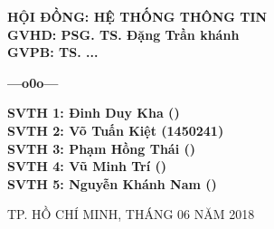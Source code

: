 \begin{titlepage}
\begin{center}
\begin{tabular}{@{}c}
	\end{tabular}
\end{center}
	
\hspace{4.5cm}	
\begin{minipage}[t]{0.7\linewidth}
\large
	\textbf{HỘI ĐỒNG: HỆ THỐNG THÔNG TIN}\\ [0.5cm]
	\textbf{GVHD: PSG. TS. Đặng Trần khánh}\\ [0.5cm]
	\textbf{GVPB: TS. ...}\\
	\vspace{-0.7cm}
	\begin{center}
	\textbf{---o0o---}
	\end{center}
	\textbf{SVTH 1: Đinh Duy Kha ()}\\ [0.5cm]
	\textbf{SVTH 2: Võ Tuấn Kiệt (1450241)}\\[0.5cm]
	\textbf{SVTH 3: Phạm Hồng Thái ()}\\[0.5cm]
	\textbf{SVTH 4: Vũ Minh Trí ()}\\[0.5cm]
	\textbf{SVTH 5: Nguyễn Khánh Nam ()}\\[0.5cm]
\end{minipage}

\vfill
\centerline{\large{TP. HỒ CHÍ MINH, THÁNG 06 NĂM 2018}}
\end{titlepage}